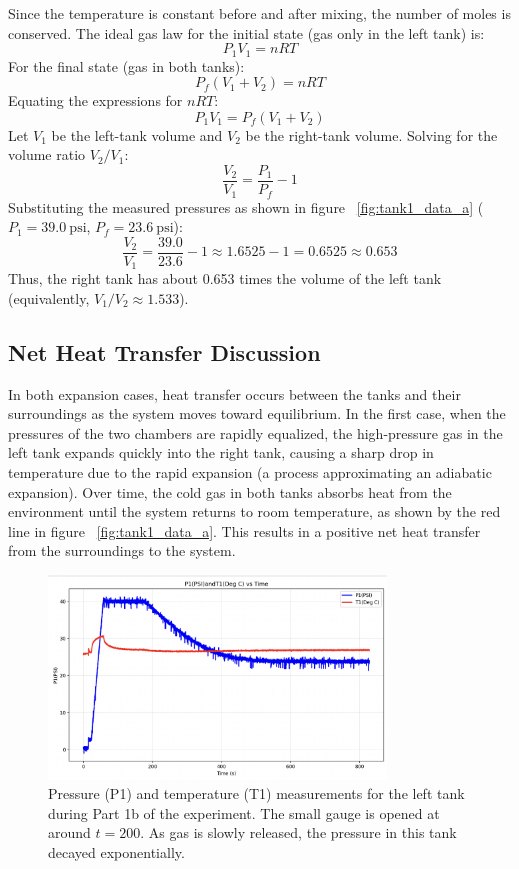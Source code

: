 \documentclass[12pt]{article}
\begin{document}
Since the temperature is constant before and after mixing, the number of moles is conserved. The ideal gas law for the initial state (gas only in the left tank) is:
\[ P_1 V_1 = n R T \]
For the final state (gas in both tanks):
\[ P_f (V_1 + V_2) = n R T \]
Equating the expressions for $nRT$:
\[ P_1 V_1 = P_f (V_1 + V_2) \]
Let $V_1$ be the left-tank volume and $V_2$ be the right-tank volume. Solving for the volume ratio $V_2/V_1$:
\[ \frac{V_2}{V_1} = \frac{P_1}{P_f} - 1 \]
Substituting the measured pressures as shown in figure ~\ref{fig:tank1_data_a} ($P_1 = 39.0~\text{psi}$, $P_f = 23.6~\text{psi}$):
\[ \frac{V_2}{V_1} = \frac{39.0}{23.6} - 1 \approx 1.6525 - 1 = 0.6525 \approx 0.653 \]
Thus, the right tank has about 0.653 times the volume of the left tank (equivalently, $V_1/V_2 \approx 1.533$).

\subsection*{Net Heat Transfer Discussion}
In both expansion cases, heat transfer occurs between the tanks and their surroundings as the system moves toward equilibrium. In the first case, when the pressures of the two chambers are rapidly equalized, the high-pressure gas in the left tank expands quickly into the right tank, causing a sharp drop in temperature due to the rapid expansion (a process approximating an adiabatic expansion). Over time, the cold gas in both tanks absorbs heat from the environment until the system returns to room temperature, as shown by the red line in figure ~\ref{fig:tank1_data_a}. This results in a positive net heat transfer from the surroundings to the system.

\begin{figure}[h!]
\centering
\includegraphics[width=0.8\textwidth]{1b-left_tank.png}
\caption{Pressure (P1) and temperature (T1) measurements for the left tank during Part 1b of the experiment. The small gauge is opened at around $t=200$. As gas is slowly released, the pressure in this tank decayed exponentially.}
\label{fig:tank1_data_b}
\end{figure}
\end{document}
